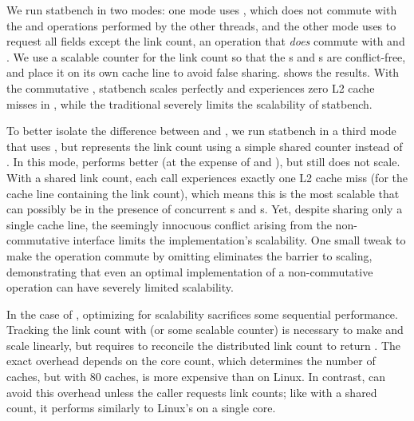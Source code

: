 We run statbench in two modes: one mode uses , which does
not commute with the  and  operations performed
by the other threads, and the other mode uses  to request
all fields except the link count, an operation that \emph{does} commute
with  and .  We use a  scalable
counter for the link count so that the
s and s are conflict-free, and place it on
its own cache line to avoid false sharing.
 shows the results.  With the commutative
, statbench scales perfectly and experiences zero L2 cache
misses in , while the traditional  severely
limits the
scalability of statbench.  

To better
isolate the difference between  and , we run
statbench in a
third mode that uses , but represents the link count
using a simple shared counter instead of .  In this mode, 
performs better (at the expense of  and ), but
still does not scale.  With a shared link count, each 
call experiences exactly one L2 cache miss (for the cache line
containing the link count), which means this is the most scalable that
 can possibly be in the presence of concurrent s
and s.  Yet, despite sharing only a single cache line, the
seemingly innocuous conflict arising from the non-commutative
interface limits the
implementation's scalability.  One small tweak to make the operation
commute by omitting  eliminates the barrier to scaling,
demonstrating that even an optimal implementation of a non-commutative
operation can have severely limited scalability.

In the case of , optimizing for scalability sacrifices some
sequential performance.  Tracking the link count with 
(or some scalable counter) is necessary to make  and
 scale linearly, but requires  to reconcile the
distributed link count to return .  The exact overhead
depends on the core count, which determines the number of 
caches, but with 80  caches,  is 
more expensive than on Linux.  
%
In contrast,  can avoid this overhead unless the caller
requests link counts; like  with a shared count, it
performs similarly to Linux's  on a single core.

